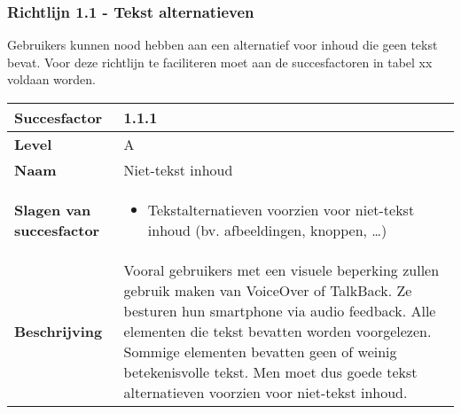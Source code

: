 \subsubsection{Richtlijn 1.1 - Tekst alternatieven}
Gebruikers kunnen nood hebben aan een alternatief voor inhoud die geen tekst bevat. Voor deze richtlijn te faciliteren moet aan de succesfactoren in tabel xx voldaan worden.
\begin{table}[H]
    \centering
 \hspace*{-1cm}\begin{tabular}{|l|p{12cm}|} 
        \hline
        \textbf{Succesfactor}                & 1.1.1                                                                                                                                                                                                                                                                                                             \\ 
        \hline
        \textbf{Level}                       & A                                                                                                                                                                                                                                                                                                                                                                             \\ 
        \hline
        \textbf{Naam}                        & Niet-tekst inhoud~                                                                                                                                                                                                                                                                                                                                                            \\ 
        \hline
        \textbf{Slagen van succesfactor}     & \begin{itemize}
            \item Tekstalternatieven voorzien voor niet-tekst inhoud (bv. afbeeldingen, knoppen, …)
        \end{itemize}                                                                                                                                                                                                      \\ 
        \hline
        \textbf{Beschrijving}                & Vooral gebruikers met een visuele beperking zullen gebruik maken van VoiceOver of TalkBack. Ze besturen hun smartphone via audio feedback. Alle elementen die tekst bevatten worden voorgelezen. Sommige elementen bevatten geen of weinig betekenisvolle tekst. Men moet dus goede tekst alternatieven voorzien voor niet-tekst inhoud.  \\ 

\end{tabular}
\end{table}
